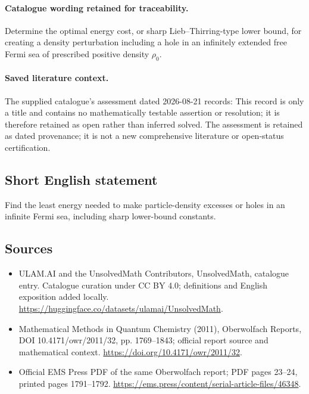 \documentclass[11pt]{article}
\begin{document}
\paragraph{Catalogue wording retained for traceability.}
Determine the optimal energy cost, or sharp Lieb–Thirring-type lower bound, for creating a density perturbation including a hole in an infinitely extended free Fermi sea of prescribed positive density $\rho_0$.

\paragraph{Saved literature context.} The supplied catalogue's assessment dated 2026-08-21 records: This record is only a title and contains no mathematically testable assertion or resolution; it is therefore retained as open rather than inferred solved. The assessment is retained as dated provenance; it is not a new comprehensive literature or open-status certification.
\subsection{Short English statement}
Find the least energy needed to make particle-density excesses or holes in an infinite Fermi sea, including sharp lower-bound constants.
\subsection{Sources}
\begin{itemize}
\item[\hypertarget{source:statement:1}{S1}] ULAM.AI and the UnsolvedMath Contributors, UnsolvedMath, catalogue entry. Catalogue curation under CC BY 4.0; definitions and English exposition added locally.
\url{https://huggingface.co/datasets/ulamai/UnsolvedMath}.
\item[\hypertarget{source:statement:2}{S2}] Mathematical Methods in Quantum Chemistry (2011), Oberwolfach Reports, DOI 10.4171/owr/2011/32, pp. 1769--1843; official report source and mathematical context.
\url{https://doi.org/10.4171/owr/2011/32}.
\item[\hypertarget{source:statement:3}{S3}] Official EMS Press PDF of the same Oberwolfach report; PDF pages 23--24, printed pages 1791--1792.
\url{https://ems.press/content/serial-article-files/46348}.
\end{itemize}
\label{end:statement}
\end{document}
